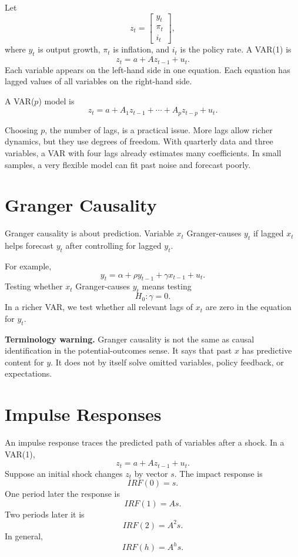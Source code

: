 Let
\[
    z_t=
    \begin{bmatrix}
        y_t\\
        \pi_t\\
        i_t
    \end{bmatrix},
\]
where \(y_t\) is output growth, \(\pi_t\) is inflation, and \(i_t\) is the policy rate. A VAR(1) is
\[
    z_t=a+Az_{t-1}+u_t.
\]
Each variable appears on the left-hand side in one equation. Each equation has lagged values of all variables on the right-hand side.

\begin{defN}[VAR(\(p\))]
A VAR(\(p\)) model is
\[
    z_t=a+A_1z_{t-1}+\cdots+A_pz_{t-p}+u_t.
\]
\end{defN}

Choosing \(p\), the number of lags, is a practical issue. More lags allow richer dynamics, but they use degrees of freedom. With quarterly data and three variables, a VAR with four lags already estimates many coefficients. In small samples, a very flexible model can fit past noise and forecast poorly.

\section{Granger Causality}

Granger causality is about prediction. Variable \(x_t\) Granger-causes \(y_t\) if lagged \(x_t\) helps forecast \(y_t\) after controlling for lagged \(y_t\).

For example,
\[
    y_t=\alpha+\rho y_{t-1}+\gamma x_{t-1}+u_t.
\]
Testing whether \(x_t\) Granger-causes \(y_t\) means testing
\[
    H_0:\gamma=0.
\]
In a richer VAR, we test whether all relevant lags of \(x_t\) are zero in the equation for \(y_t\).

\begin{boxF}
\textbf{Terminology warning.} Granger causality is not the same as causal identification in the potential-outcomes sense. It says that past \(x\) has predictive content for \(y\). It does not by itself solve omitted variables, policy feedback, or expectations.
\end{boxF}

\section{Impulse Responses}

An impulse response traces the predicted path of variables after a shock. In a VAR(1),
\[
    z_t=a+Az_{t-1}+u_t.
\]
Suppose an initial shock changes \(z_t\) by vector \(s\). The impact response is
\[
    IRF(0)=s.
\]
One period later the response is
\[
    IRF(1)=As.
\]
Two periods later it is
\[
    IRF(2)=A^2s.
\]
In general,
\[
    IRF(h)=A^h s.
\]

